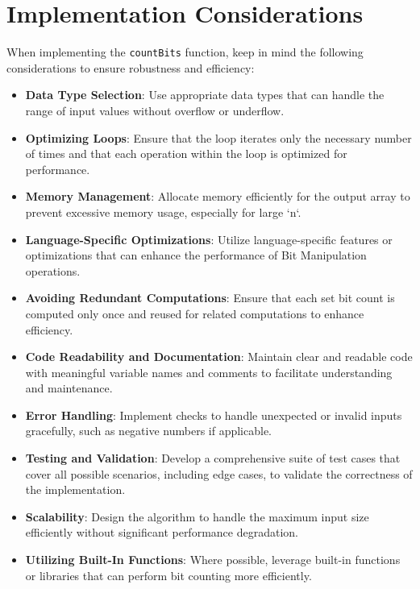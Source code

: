 \section*{Implementation Considerations}

When implementing the \texttt{countBits} function, keep in mind the following considerations to ensure robustness and efficiency:

\begin{itemize}
    \item \textbf{Data Type Selection}: Use appropriate data types that can handle the range of input values without overflow or underflow.
    
    \item \textbf{Optimizing Loops}: Ensure that the loop iterates only the necessary number of times and that each operation within the loop is optimized for performance.
    
    \item \textbf{Memory Management}: Allocate memory efficiently for the output array to prevent excessive memory usage, especially for large `n`.
    
    \item \textbf{Language-Specific Optimizations}: Utilize language-specific features or optimizations that can enhance the performance of Bit Manipulation operations.
    
    \item \textbf{Avoiding Redundant Computations}: Ensure that each set bit count is computed only once and reused for related computations to enhance efficiency.
    
    \item \textbf{Code Readability and Documentation}: Maintain clear and readable code with meaningful variable names and comments to facilitate understanding and maintenance.
    
    \item \textbf{Error Handling}: Implement checks to handle unexpected or invalid inputs gracefully, such as negative numbers if applicable.
    
    \item \textbf{Testing and Validation}: Develop a comprehensive suite of test cases that cover all possible scenarios, including edge cases, to validate the correctness of the implementation.
    
    \item \textbf{Scalability}: Design the algorithm to handle the maximum input size efficiently without significant performance degradation.
    
    \item \textbf{Utilizing Built-In Functions}: Where possible, leverage built-in functions or libraries that can perform bit counting more efficiently.
\end{itemize}

